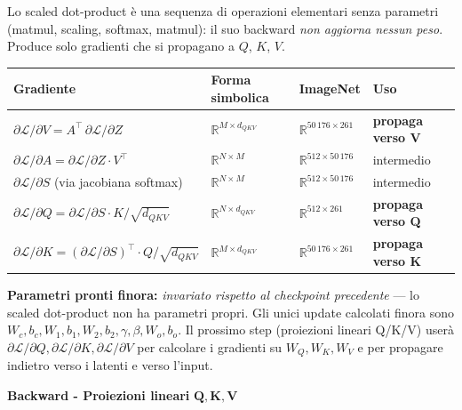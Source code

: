 \documentclass[
  11pt,
]{article}
\begin{document}
\begin{notabox}[title={\textbf{Checkpoint gradienti --- fine Scaled Dot-Product backward}}]
Lo scaled dot-product è una sequenza di operazioni elementari senza parametri (matmul, scaling, softmax, matmul): il suo backward \emph{non aggiorna nessun peso}. Produce solo gradienti che si propagano a $Q$, $K$, $V$.

\medskip
\begin{center}
{\small
\begin{tabular}{@{}llll@{}}
\toprule
\textbf{Gradiente} & \textbf{Forma simbolica} & \textbf{ImageNet} & \textbf{Uso} \\
\midrule
$\partial\mathcal{L}/\partial V = A^\top\, \partial\mathcal{L}/\partial Z$ & $\mathbb{R}^{M \times d_{QKV}}$ & $\mathbb{R}^{50\,176 \times 261}$ & \textbf{propaga verso V} \\
$\partial\mathcal{L}/\partial A = \partial\mathcal{L}/\partial Z \cdot V^\top$ & $\mathbb{R}^{N \times M}$ & $\mathbb{R}^{512 \times 50\,176}$ & intermedio \\
$\partial\mathcal{L}/\partial S$ (via jacobiana softmax) & $\mathbb{R}^{N \times M}$ & $\mathbb{R}^{512 \times 50\,176}$ & intermedio \\
$\partial\mathcal{L}/\partial Q = \partial\mathcal{L}/\partial S \cdot K / \sqrt{d_{QKV}}$ & $\mathbb{R}^{N \times d_{QKV}}$ & $\mathbb{R}^{512 \times 261}$ & \textbf{propaga verso Q} \\
$\partial\mathcal{L}/\partial K = (\partial\mathcal{L}/\partial S)^\top \cdot Q / \sqrt{d_{QKV}}$ & $\mathbb{R}^{M \times d_{QKV}}$ & $\mathbb{R}^{50\,176 \times 261}$ & \textbf{propaga verso K} \\
\bottomrule
\end{tabular}
}
\end{center}

\medskip
\textbf{Parametri pronti finora:} \emph{invariato rispetto al checkpoint precedente} --- lo scaled dot-product non ha parametri propri. Gli unici update calcolati finora sono $W_c, b_c, W_1, b_1, W_2, b_2, \gamma, \beta, W_o, b_o$. Il prossimo step (proiezioni lineari Q/K/V) userà $\partial\mathcal{L}/\partial Q, \partial\mathcal{L}/\partial K, \partial\mathcal{L}/\partial V$ per calcolare i gradienti su $W_Q, W_K, W_V$ e per propagare indietro verso i latenti e verso l'input.
\end{notabox}

\textbf{Backward - Proiezioni lineari}
\(\mathbf{Q}\mathbf{,}\mathbf{K}\mathbf{,}\mathbf{V}\)
\end{document}
